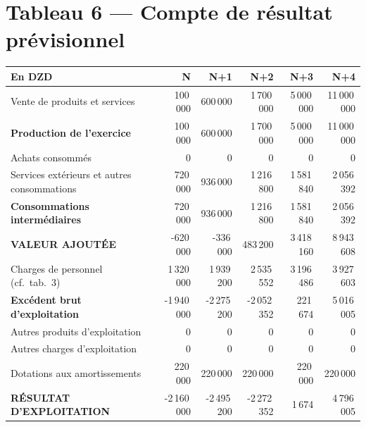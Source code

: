 \documentclass[11pt,a4paper]{article}
\begin{document}
\section{Tableau 6 — Compte de résultat prévisionnel}

\begin{center}
\small
\begin{longtable}{l r r r r r}
\toprule
\textbf{En DZD} & \textbf{N} & \textbf{N+1} & \textbf{N+2} & \textbf{N+3} & \textbf{N+4} \\
\midrule
\endhead

Vente de produits et services                &    100\,000 &    600\,000 &  1\,700\,000 &  5\,000\,000 & 11\,000\,000 \\
\midrule
\textbf{Production de l'exercice}            &    100\,000 &    600\,000 &  1\,700\,000 &  5\,000\,000 & 11\,000\,000 \\

\midrule
Achats consommés                             &      0      &      0      &       0      &       0      &       0      \\
Services extérieurs et autres consommations  &    720\,000 &    936\,000 &  1\,216\,800 &  1\,581\,840 &  2\,056\,392 \\
\rowcolor{tablesub}\textbf{Consommations intermédiaires} & 720\,000 & 936\,000 & 1\,216\,800 & 1\,581\,840 & 2\,056\,392 \\

\midrule
\rowcolor{tabletot}\color{white}\bfseries
\textbf{VALEUR AJOUTÉE}                      &   -620\,000 &   -336\,000 &    483\,200 &  3\,418\,160 &  8\,943\,608 \\
Charges de personnel (cf.\ tab.\ 3)         &  1\,320\,000 &  1\,939\,200 &  2\,535\,552 &  3\,196\,486 &  3\,927\,603 \\
\midrule
\rowcolor{tablesub}\textbf{Excédent brut d'exploitation}  & -1\,940\,000 & -2\,275\,200 & -2\,052\,352 &    221\,674 &  5\,016\,005 \\

\midrule
Autres produits d'exploitation               &      0      &      0      &       0      &       0      &       0      \\
Autres charges d'exploitation               &      0      &      0      &       0      &       0      &       0      \\
Dotations aux amortissements                &    220\,000 &    220\,000 &    220\,000 &    220\,000 &    220\,000 \\
\midrule
\rowcolor{tabletot}\color{white}\bfseries
\textbf{RÉSULTAT D'EXPLOITATION}             & -2\,160\,000 & -2\,495\,200 & -2\,272\,352 &       1\,674 &  4\,796\,005 \\


\end{longtable}
\end{center}
\end{document}

